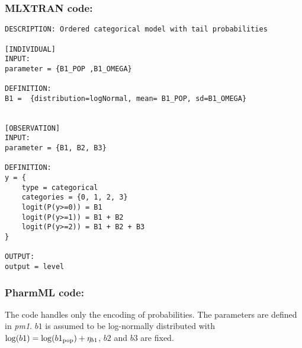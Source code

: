 \myEndLine

\subsubsection{MLXTRAN code:}

\myStartLine

\lstset{language=MLXTRANcode}
\begin{lstlisting}
DESCRIPTION: Ordered categorical model with tail probabilities

[INDIVIDUAL]
INPUT:
parameter = {B1_POP ,B1_OMEGA}

DEFINITION:
B1 =  {distribution=logNormal, mean= B1_POP, sd=B1_OMEGA}


[OBSERVATION]
INPUT:
parameter = {B1, B2, B3}

DEFINITION:
y = {
	type = categorical
	categories = {0, 1, 2, 3}
	logit(P(y>=0)) = B1
	logit(P(y>=1)) = B1 + B2
	logit(P(y>=2)) = B1 + B2 + B3
}

OUTPUT:
output = level
\end{lstlisting}

\myEndLine

\subsubsection{PharmML code:}
The code handles only the encoding of probabilities. The parameters are
defined in  \emph{pm1}. $b1$ is assumed to be log-normally distributed with
$\log(b1) = \log(b1_{\rm pop}) + \eta_{b1}$, $b2$ and $b3$ are fixed.


